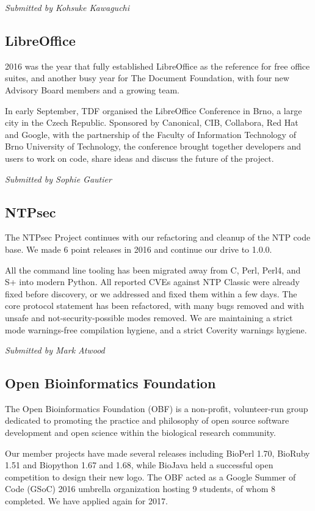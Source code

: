 \documentclass[letterpaper]{report}
\begin{document}
{\em Submitted by Kohsuke Kawaguchi}

\subsection{LibreOffice}

2016 was the year that fully established LibreOffice as the reference
for free office suites, and another busy year for The Document
Foundation, with four new Advisory Board members and a growing team.

In early September, TDF organised the LibreOffice Conference in Brno, a
large city in the Czech Republic. Sponsored by Canonical, CIB,
Collabora, Red Hat and Google, with the partnership of the Faculty of
Information Technology of Brno University of Technology, the conference
brought together developers and users to work on code, share ideas and
discuss the future of the project.

{\em Submitted by Sophie Gautier}

\subsection{NTPsec}

The NTPsec Project continues with our refactoring and cleanup of the NTP
code base.  We made 6 point releases in 2016 and continue our drive to 1.0.0.

All the command line tooling has been migrated away from C, Perl, Perl4,
and S+ into modern Python.  All reported CVEs against NTP Classic were
already fixed before discovery, or we addressed and fixed them within a
few days.  The core protocol statement has been refactored, with many
bugs removed and with unsafe and not-security-possible modes removed.
We are maintaining a strict mode warnings-free compilation hygiene, and
a strict Coverity warnings hygiene.

{\em Submitted by Mark Atwood}

\subsection{Open Bioinformatics Foundation}

The Open Bioinformatics Foundation (OBF) is a non-profit, volunteer-run
group dedicated to promoting the practice and philosophy of open source
software development and open science within the biological research
community.

Our member projects have made several releases including BioPerl 1.70,
BioRuby 1.51 and Biopython 1.67 and 1.68, while BioJava held a
successful open competition to design their new logo. The OBF acted as a
Google Summer of Code (GSoC) 2016 umbrella organization hosting 9
students, of whom 8 completed. We have applied again for 2017.
\end{document}
